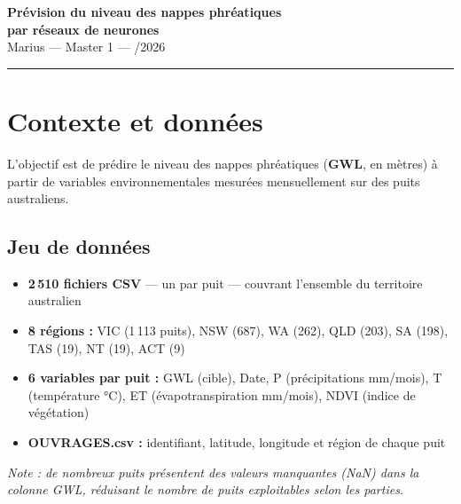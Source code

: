 \documentclass[11pt, a4paper]{article}
\begin{document}
\begin{center}
  {\LARGE\bfseries\color{bleufonce}
    Prévision du niveau des nappes phréatiques\\[4pt]
    par réseaux de neurones}\\[8pt]
  {\normalsize Marius \quad — \quad Master 1 \quad — /2026}
\end{center}

\vspace{4pt}
\textcolor{bleufonce}{\rule{\linewidth}{1.2pt}}
\vspace{6pt}

\section{Contexte et données}

L'objectif est de prédire le niveau des nappes phréatiques (\textbf{GWL}, en mètres)
à partir de variables environnementales mesurées mensuellement sur des puits australiens.

\subsection{Jeu de données}

\begin{itemize}
  \setlength\itemsep{2pt}
  \item \textbf{2\,510 fichiers CSV} — un par puit — couvrant l'ensemble du territoire australien
  \item \textbf{8 régions :} VIC (1\,113 puits), NSW (687), WA (262), QLD (203),
        SA (198), TAS (19), NT (19), ACT (9)
  \item \textbf{6 variables par puit :} GWL (cible), Date, P (précipitations mm/mois),
        T (température °C), ET (évapotranspiration mm/mois), NDVI (indice de végétation)
  \item \textbf{OUVRAGES.csv :} identifiant, latitude, longitude et région de chaque puit
\end{itemize}

\textit{Note : de nombreux puits présentent des valeurs manquantes (NaN) dans la colonne GWL,
réduisant le nombre de puits exploitables selon les parties.}

\end{document}
